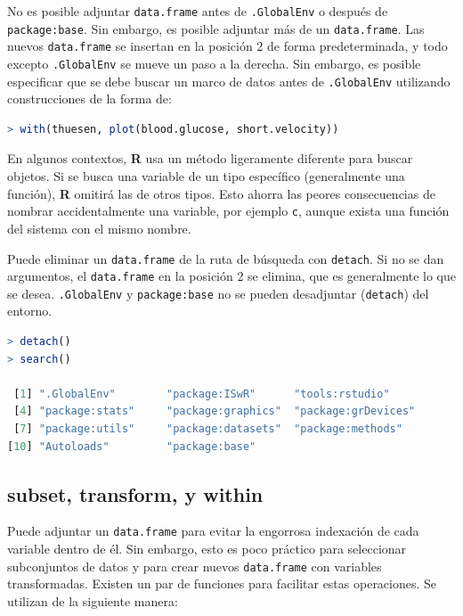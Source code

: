 No es posible adjuntar \texttt{data.frame} antes de \texttt{.GlobalEnv} o después de
\texttt{package:base}. Sin embargo, es posible adjuntar más de un \texttt{data.frame}. Las
nuevos \texttt{data.frame} se insertan en la posición 2 de forma predeterminada, y
todo excepto \texttt{.GlobalEnv} se mueve un paso a la derecha. Sin embargo, es posible
especificar que se debe buscar un marco de datos antes de \texttt{.GlobalEnv} utilizando
construcciones de la forma de:

\begin{lstlisting}[language=R]
> with(thuesen, plot(blood.glucose, short.velocity))
\end{lstlisting}

En algunos contextos, \textbf{R} usa un método ligeramente diferente para
buscar objetos. Si se busca una variable de un tipo específico (generalmente
una función), \textbf{R} omitirá las de otros tipos. Esto ahorra las peores
consecuencias de nombrar accidentalmente una variable, por ejemplo \texttt{c},
aunque exista una función del sistema con el mismo nombre.

Puede eliminar un \texttt{data.frame} de la ruta de búsqueda con
\texttt{detach}. Si no se dan argumentos, el \texttt{data.frame} en la posición
2 se elimina, que es generalmente lo que se desea. \texttt{.GlobalEnv} y \texttt{package:base} no
se pueden desadjuntar (\texttt{detach}) del entorno. 

\begin{lstlisting}[language=R]
> detach()
> search()

 [1] ".GlobalEnv"        "package:ISwR"      "tools:rstudio"    
 [4] "package:stats"     "package:graphics"  "package:grDevices"
 [7] "package:utils"     "package:datasets"  "package:methods"  
[10] "Autoloads"         "package:base"    
\end{lstlisting}

\subsection{subset, transform, y within}

Puede adjuntar un \texttt{data.frame} para evitar la engorrosa indexación de cada
variable dentro de él. Sin embargo, esto es poco práctico para seleccionar
subconjuntos de datos y para crear nuevos \texttt{data.frame} con variables
transformadas. Existen un par de funciones para facilitar estas operaciones. Se
utilizan de la siguiente manera:

